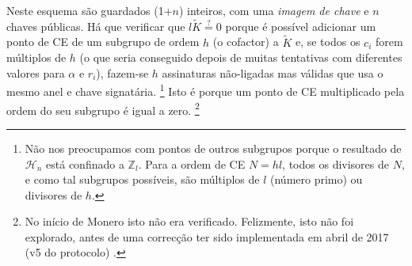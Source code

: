 \begin{description}
Neste esquema são guardados (1+$n$) inteiros, com uma {\em imagem de chave} e $n$ chaves públicas. 
Há que verificar que $l \tilde{K} \stackrel{?}{=} 0$ porque é possível adicionar um ponto de CE de um subgrupo de ordem $h$ (o cofactor) a $\tilde{K}$ e, se todos os $c_i$ forem múltiplos de $h$ (o que seria conseguido depois de muitas tentativas com diferentes valores para $\alpha$ e $r_i$), fazem-se $h$ assinaturas não-ligadas mas válidas que usa o mesmo anel e chave signatária. 
\footnote{Não nos preocupamos com pontos de outros subgrupos porque o resultado de $\mathcal{H}_n$ está confinado a $\mathbb{Z}_l$. Para a ordem de CE $N = h l$, todos os divisores de $N$, e como tal subgrupos possíveis, são múltiplos de $l$ (número primo) ou divisores de $h$.} 
Isto é porque um ponto de CE multiplicado pela ordem do seu subgrupo é igual a zero.
\footnote{No início de Monero isto não era verificado. Felizmente, isto não foi explorado, antes de uma correcção ter sido implementada em abril de 2017 (v5 do protocolo) \cite{key-image-bug}.}


\end{description}
